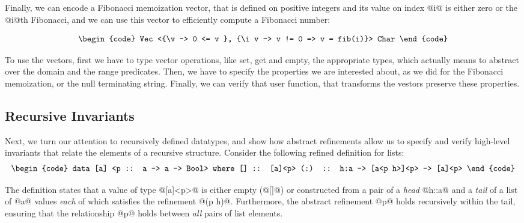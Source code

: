 Finally, we can encode a Fibonacci memoization vector, that is defined
on positive integers and its value on index @i@ is either zero
or the @i@th Fibonacci, and we can use this vector to efficiently compute
a Fibonacci number:

$$\centering\begin{tabular}{c}\begin{code}
Vec <{\v -> 0 <= v }, {\i v -> v != 0 => v = fib(i)}> Char
\end{code}\end{tabular}$$

To use the vectors, first we have to type vector operations, like 
set, get and empty, the appropriate types, which actually means 
to abstract over the domain and the range predicates. 
%
Then, we have to specify the properties we are interested about, 
as we did for the Fibonacci memoization, or the null terminating string.
% 
Finally, we can verify that user function, that transforms the vestors
preserve these properties.

\subsection{Recursive Invariants}

Next, we turn our attention to recursively defined datatypes, and show 
how abstract refinements allow us to specify and verify high-level
invariants that relate the elements of a recursive structure.
Consider the following refined definition for lists:
%
$$\centering\begin{tabular}{c}\begin{code}
data [a] <p :: a -> a -> Bool> where
  []  :: [a]<p>
  (:) :: h:a -> [a<p h>]<p> -> [a]<p>
\end{code}\end{tabular}$$

The definition states that a value of type @[a]<p>@ 
is either empty (@[]@) or constructed from a pair of  
a \emph{head} @h::a@ and a \emph{tail} of a list of 
@a@ values \emph{each} of which satisfies the refinement @(p h)@. 
Furthermore, the abstract refinement @p@ holds recursively
within the tail, ensuring that the relationship @p@ 
holds between \emph{all} pairs of list elements.

